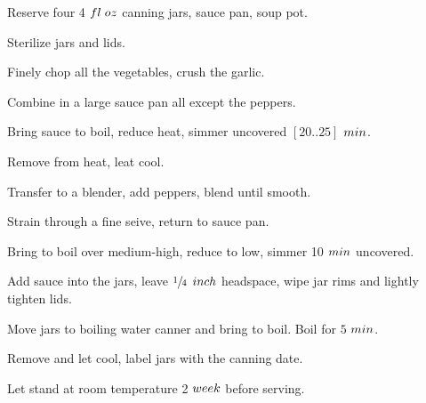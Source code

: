 \begin{preparation}
\item Reserve four 4 $\fluidounce$ canning jars, sauce pan, soup pot.
\item Sterilize jars and lids.
\item Finely chop all the vegetables, crush the garlic.
\item Combine in a large sauce pan all except the peppers.
\item Bring sauce to boil, reduce heat, simmer uncovered $[20 .. 25]$ $\minute$.
\item Remove from heat, leat cool.
\item Transfer to a blender, add peppers, blend until smooth.
\item Strain through a fine seive, return to sauce pan.
\item Bring to boil over medium-high, reduce to low, simmer 10 $\minute$ uncovered.
\item Add sauce into the jars, leave $\onefourth$ $\inch$ headspace, wipe jar rims and lightly tighten lids.
\item Move jars to boiling water canner and bring to boil.
    Boil for $5$ $\minute$.
\item Remove and let cool, label jars with the canning date.
\item Let stand at room temperature 2 $\week$ before serving.
\end{preparation}

\recipeend%

